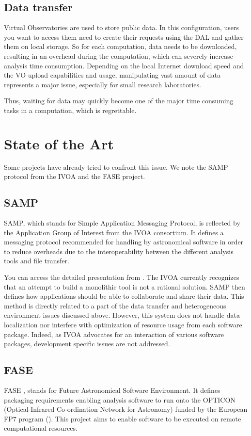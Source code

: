 		\subsection{Data transfer}
			Virtual Observatories are used to store public data. In this configuration, users you want to access them need to create their requests using the DAL and gather them on local storage. So for each computation, data needs to be downloaded, resulting in an overhead during the computation, which can severely increase analysis time consumption. Depending on the local Internet download speed and the VO upload capabilities and usage, manipulating vast amount of data represents a major issue, especially for small research laboratories.
			
			Thus, waiting for data may quickly become one of the major time consuming tasks in a computation, which is regrettable.

	\section{State of the Art}
		Some projects have already tried to confront this issue. We note the SAMP protocol from the IVOA and the FASE project.
		
		\subsection{SAMP}
			SAMP, which stands for Simple Application Messaging Protocol, is reflected by the Application Group of Interest from the IVOA consortium. It defines a messaging protocol recommended for handling by astronomical software in order to reduce overheads due to the interoperability between the different analysis tools and file transfer.
			
			You can access the detailed presentation from \cite{Taylor}. The IVOA currently recognizes that an attempt to build a monolithic tool is not a rational solution. SAMP then defines how applications should be able to collaborate and share their data. This method is directly related to a part of the data transfer and heterogeneous environment issues discussed above. However, this system does not handle data localization nor interfere with optimization of resource usage from each software package. Indeed, as IVOA advocates for an interaction of various software packages, development specific issues are not addressed. 
			
		\subsection{FASE}
			FASE \citep{Granet}, stands for Future Astronomical Software Environment. It defines packaging requirements enabling analysis software to run onto the OPTICON (Optical-Infrared Co-ordination Network for Astronomy) funded by the European FP7 program (\cite{Fase}). This project aims to enable software to be executed on remote computational resources.
			
